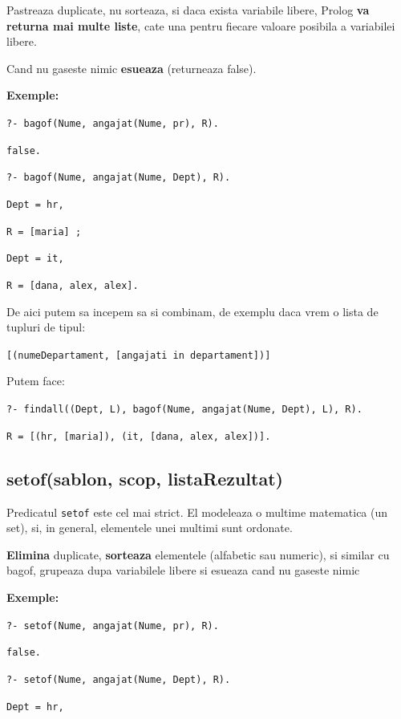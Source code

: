 Pastreaza duplicate, nu sorteaza, si daca exista variabile libere, Prolog \textbf{va returna mai multe liste},
cate una pentru fiecare valoare posibila a variabilei libere.

Cand nu gaseste nimic \textbf{esueaza} (returneaza false).

\textbf{Exemple:}

\texttt{?- bagof(Nume, angajat(Nume, pr), R).}

\texttt{false.}

\vspace{\baselineskip}

\texttt{?- bagof(Nume, angajat(Nume, Dept), R).}

\texttt{Dept = hr,}

\texttt{R = [maria] ;}

\texttt{Dept = it,}

\texttt{R = [dana, alex, alex].}

\newpage

De aici putem sa incepem sa si combinam, de exemplu daca vrem o lista de tupluri de tipul:

\texttt{[(numeDepartament, [angajati in departament])]}

Putem face:

\texttt{?- findall((Dept, L), bagof(Nume, angajat(Nume, Dept), L), R).}

\texttt{R = [(hr, [maria]), (it, [dana, alex, alex])].}



\subsection*{setof(sablon, scop, listaRezultat)}
Predicatul \texttt{setof} este cel mai strict. El modeleaza o multime matematica (un set), si, in general, elementele unei multimi sunt ordonate.

\textbf{Elimina} duplicate, \textbf{sorteaza} elementele (alfabetic sau numeric), si similar cu bagof,
grupeaza dupa variabilele libere si esueaza cand nu gaseste nimic

\textbf{Exemple:}

\texttt{?- setof(Nume, angajat(Nume, pr), R).}

\texttt{false.}

\vspace{\baselineskip}

\texttt{?- setof(Nume, angajat(Nume, Dept), R).}

\texttt{Dept = hr,}

